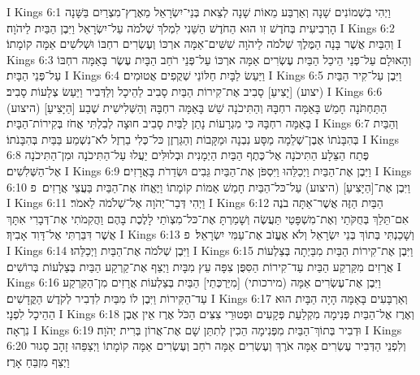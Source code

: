 I Kings 6:1	וַיְהִי בִשְׁמוֹנִים שָׁנָה וְאַרְבַּע מֵאוֹת שָׁנָה לְצֵאת בְּנֵי־יִשְׂרָאֵל מֵאֶרֶץ־מִצְרַיִם בַּשָּׁנָה הָרְבִיעִית בְּחֹדֶשׁ זִו הוּא הַחֹדֶשׁ הַשֵּׁנִי לִמְלֹךְ שְׁלֹמֹה עַל־יִשְׂרָאֵל וַיִּבֶן הַבַּיִת לַיהֹוָה׃
I Kings 6:2	וְהַבַּיִת אֲשֶׁר בָּנָה הַמֶּלֶךְ שְׁלֹמֹה לַיהֹוָה שִׁשִּׁים־אַמָּה ארְכּוֹ וְעֶשְׂרִים רחְבּוֹ וּשְׁלֹשִׁים אַמָּה קוֹמָתוֹ׃
I Kings 6:3	וְהָאוּלָם עַל־פְּנֵי הֵיכַל הַבַּיִת עֶשְׂרִים אַמָּה ארְכּוֹ עַל־פְּנֵי רֹחַב הַבָּיִת עֶשֶׂר בָּאַמָּה רחְבּוֹ עַל־פְּנֵי הַבָּיִת׃
I Kings 6:4	וַיַּעַשׂ לַבָּיִת חַלּוֹנֵי שְׁקֻפִים אֲטוּמִים׃
I Kings 6:5	וַיִּבֶן עַל־קִיר הַבַּיִת (יצוע) [יָצִיעַ] סָבִיב אֶת־קִירוֹת הַבַּיִת סָבִיב לַהֵיכָל וְלַדְּבִיר וַיַּעַשׂ צְלָעוֹת סָבִיב׃
I Kings 6:6	(היצוע) [הַיָּצִיעַ] הַתַּחְתֹּנָה חָמֵשׁ בָּאַמָּה רחְבָּהּ וְהַתִּיכֹנָה שֵׁשׁ בָּאַמָּה רחְבָּהּ וְהַשְּׁלִישִׁית שֶׁבַע בָּאַמָּה רחְבָּהּ כִּי מִגְרָעוֹת נָתַן לַבַּיִת סָבִיב חוּצָה לְבִלְתִּי אֲחֹז בְּקִירוֹת־הַבָּיִת׃
I Kings 6:7	וְהַבַּיִת בְּהִבָּנֹתוֹ אֶבֶן־שְׁלֵמָה מַסָּע נִבְנָה וּמַקָּבוֹת וְהַגַּרְזֶן כּל־כְּלִי בַרְזֶל לֹא־נִשְׁמַע בַּבַּיִת בְּהִבָּנֹתוֹ׃
I Kings 6:8	פֶּתַח הַצֵּלָע הַתִּיכֹנָה אֶל־כֶּתֶף הַבַּיִת הַיְמָנִית וּבְלוּלִּים יַעֲלוּ עַל־הַתִּיכֹנָה וּמִן־הַתִּיכֹנָה אֶל־הַשְּׁלִשִׁים׃
I Kings 6:9	וַיִּבֶן אֶת־הַבַּיִת וַיְכַלֵּהוּ וַיִּסְפֹּן אֶת־הַבַּיִת גֵּבִים וּשְׂדֵרֹת בָּאֲרָזִים׃
I Kings 6:10	וַיִּבֶן אֶת־[הַיָּצִיעַ] (היצוע) עַל־כּל־הַבַּיִת חָמֵשׁ אַמּוֹת קוֹמָתוֹ וַיֶּאֱחֹז אֶת־הַבַּיִת בַּעֲצֵי אֲרָזִים׃ {פ}
I Kings 6:11	וַיְהִי דְּבַר־יְהֹוָה אֶל־שְׁלֹמֹה לֵאמֹר׃
I Kings 6:12	הַבַּיִת הַזֶּה אֲשֶׁר־אַתָּה בֹנֶה אִם־תֵּלֵךְ בְּחֻקֹּתַי וְאֶת־מִשְׁפָּטַי תַּעֲשֶׂה וְשָׁמַרְתָּ אֶת־כּל־מִצְוֺתַי לָלֶכֶת בָּהֶם וַהֲקִמֹתִי אֶת־דְּבָרִי אִתָּךְ אֲשֶׁר דִּבַּרְתִּי אֶל־דָּוִד אָבִיךָ׃
I Kings 6:13	וְשָׁכַנְתִּי בְּתוֹךְ בְּנֵי יִשְׂרָאֵל וְלֹא אֶעֱזֹב אֶת־עַמִּי יִשְׂרָאֵל׃ {פ}
I Kings 6:14	וַיִּבֶן שְׁלֹמֹה אֶת־הַבַּיִת וַיְכַלֵּהוּ׃
I Kings 6:15	וַיִּבֶן אֶת־קִירוֹת הַבַּיִת מִבַּיְתָה בְּצַלְעוֹת אֲרָזִים מִקַּרְקַע הַבַּיִת עַד־קִירוֹת הַסִּפֻּן צִפָּה עֵץ מִבָּיִת וַיְצַף אֶת־קַרְקַע הַבַּיִת בְּצַלְעוֹת בְּרוֹשִׁים׃
I Kings 6:16	וַיִּבֶן אֶת־עֶשְׂרִים אַמָּה (מירכותי) [מִיַּרְכְּתֵי] הַבַּיִת בְּצַלְעוֹת אֲרָזִים מִן־הַקַּרְקַע עַד־הַקִּירוֹת וַיִּבֶן לוֹ מִבַּיִת לִדְבִיר לְקֹדֶשׁ הַקֳּדָשִׁים׃
I Kings 6:17	וְאַרְבָּעִים בָּאַמָּה הָיָה הַבָּיִת הוּא הַהֵיכָל לִפְנָי׃
I Kings 6:18	וְאֶרֶז אֶל־הַבַּיִת פְּנִימָה מִקְלַעַת פְּקָעִים וּפְטוּרֵי צִצִּים הַכֹּל אֶרֶז אֵין אֶבֶן נִרְאָה׃
I Kings 6:19	וּדְבִיר בְּתוֹךְ־הַבַּיִת מִפְּנִימָה הֵכִין לְתִתֵּן שָׁם אֶת־אֲרוֹן בְּרִית יְהֹוָה׃
I Kings 6:20	וְלִפְנֵי הַדְּבִיר עֶשְׂרִים אַמָּה אֹרֶךְ וְעֶשְׂרִים אַמָּה רֹחַב וְעֶשְׂרִים אַמָּה קוֹמָתוֹ וַיְצַפֵּהוּ זָהָב סָגוּר וַיְצַף מִזְבֵּחַ אָרֶז׃
